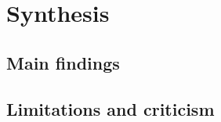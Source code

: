 	
\chapter{Synthesis}
\label{chap:synth}
\newpage



\section{Main findings}
\label{sec:synth:mainfind}

%  
%
%
%



\newpage


\section{Limitations and criticism}
\label{sec:synth:limits}

